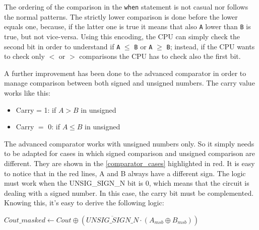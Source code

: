 The ordering of the comparison in the \texttt{when} statement is not casual nor follows the normal patterns. The strictly lower comparison is done before the lower equals one, because, if the latter one is true it means that also \texttt{A} lower than \texttt{B} is true, but not vice-versa. Using this encoding, the CPU can simply check the second bit in order to understand if \texttt{A} $\leq$ \texttt{B} or \texttt{A} $\geq$ \texttt{B}; instead, if the CPU wants to check only $<$ or $>$ comparisons the CPU has to check also the first bit.

 

A further improvement has been done to the advanced comparator in order to manage comparison between both signed and unsigned numbers. The carry value works like this:
\begin{itemize}
  \item Carry = 1: if \(A > B\) in unsigned
  \item Carry \(=\) 0: if \(A \leq B\) in unsigned
\end{itemize}

The advanced comparator works with unsigned numbers only. So it simply needs to be adapted for cases in which signed comparison and unsigned comparison are different. They are shown in the \autoref{comparator_cases} highlighted in red. 
It is easy to notice that in the red lines, A and B always have a different sign. The logic must work when the UNSIG\_SIGN\_N bit is 0, which means that the circuit is dealing with a signed number. In this case, the carry bit must be complemented. Knowing this, it's easy to derive the following logic:

\begin{center}
	$Cout\_masked \leftarrow Cout \oplus (\overline{UNSIG\_SIGN\_N} \cdot (A_{msb} \oplus B_{msb}))$
\end{center}

